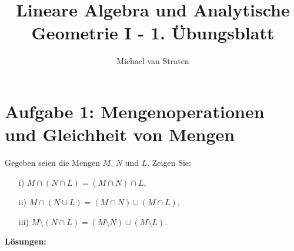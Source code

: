 \documentclass{exam}
\title{Lineare Algebra und Analytische Geometrie I - 1. Übungsblatt}
\author{Michael van Straten}
\begin{document}
\maketitle
\section*{Aufgabe 1: Mengenoperationen und Gleichheit von Mengen}
Gegeben seien die Mengen $M$, $N$ und $L$. Zeigen Sie:
\begin{enumerate}
    \item[i)] $M \cap (N \cap L) = (M \cap N) \cap L$,
    \item[ii)] $M \cap (N \cup L) = (M \cap N) \cup (M \cap L)$,
    \item[iii)] $M \setminus (N \cap L) = (M \setminus N) \cup (M \setminus
          L)$.
\end{enumerate}
\textbf{Lösungen:}
\end{document}

